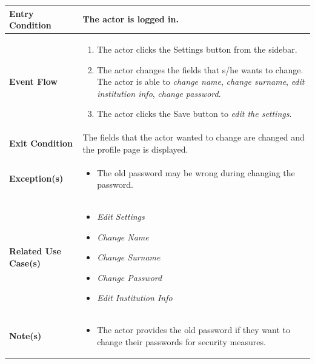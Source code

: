 \begin{enumerate}
\begin{center}
\begin{tabular}{ | m{10em} | m{10cm}| }
      \hline
      \textbf{Entry Condition} & The actor is logged in. \\ 
      \hline
      \textbf{Event Flow} & 
          \begin{enumerate}[(1)]
              \item The actor clicks the Settings button from the sidebar.
              \item The actor changes the fields that s/he wants to change. The actor is able to \textit{change name}, \textit{change surname}, \textit{edit institution info}, \textit{change password}.
              \item The actor clicks the Save button to \textit{edit the settings}.
          \end{enumerate}
      \\ 
      \hline
      \textbf{Exit Condition} & The fields that the actor wanted to change are changed and the profile page is displayed.  \\ 
      \hline
      \textbf{Exception(s)} & 
      \begin{itemize}
          \item The old password may be wrong during changing the password.
      \end{itemize}
          \\ 
      \hline
      \textbf{Related Use Case(s)} & 
      \begin{itemize}
          \item \textit{Edit Settings}
          \item \textit{Change Name}
          \item \textit{Change Surname}
          \item \textit{Change Password}
          \item \textit{Edit Institution Info}
      \end{itemize}
          \\ 
      \hline
      \textbf{Note(s)} & 
      \begin{itemize}
          \item The actor provides the old password if they want to change their passwords for security measures.
      \end{itemize}
          \\ 
      \hline
    \end{tabular}
     \label{tbl:uc19}
\end{center}

\newpage



\end{enumerate}

